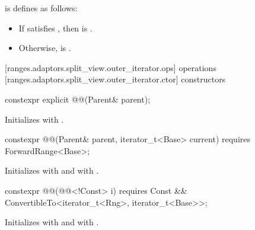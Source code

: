 \pnum
{} is defines
as follows:
\begin{itemize}
\item If  satisfies , then
 is .
\item Otherwise,  is .
\end{itemize}

[ranges.adaptors.split_view.outer_iterator.ops]{ operations}
[ranges.adaptors.split_view.outer_iterator.ctor]{ constructors}

%
\begin{itemdecl}
constexpr explicit @@(Parent& parent);
\end{itemdecl}

\begin{itemdescr}
\pnum
\effects Initializes  with .
\end{itemdescr}

%
\begin{itemdecl}
constexpr @@(Parent& parent, iterator_t<Base> current)
requires ForwardRange<Base>;
\end{itemdecl}

\begin{itemdescr}
\pnum
\effects Initializes  with  and 
with .
\end{itemdescr}

%
\begin{itemdecl}
constexpr @@(@@<!Const> i) requires Const &&
ConvertibleTo<iterator_t<Rng>, iterator_t<Base>>;
\end{itemdecl}

\begin{itemdescr}
\pnum
\effects Initializes  with  and 
with .
\end{itemdescr}

